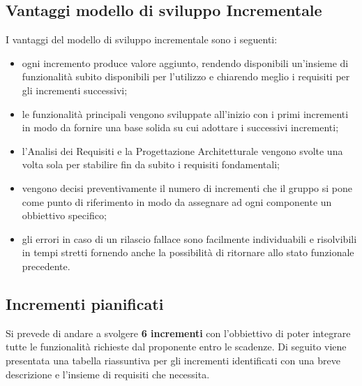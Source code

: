 \subsection{Vantaggi modello di sviluppo Incrementale}
I vantaggi del modello di sviluppo incrementale sono i seguenti:
\begin{itemize}
	\item ogni incremento produce valore aggiunto, rendendo disponibili un'insieme di funzionalità subito disponibili per l'utilizzo e chiarendo meglio i requisiti per gli incrementi successivi;
	\item le funzionalità principali vengono sviluppate all'inizio con i primi incrementi in modo da fornire una base solida su cui adottare i successivi incrementi;
	\item l'Analisi dei Requisiti e la Progettazione Architetturale vengono svolte una volta sola per stabilire fin da subito i requisiti fondamentali;
	\item vengono decisi preventivamente il numero di incrementi che il gruppo si pone come punto di riferimento in modo da assegnare ad ogni componente un obbiettivo specifico;
	\item gli errori in caso di un rilascio fallace sono facilmente individuabili e risolvibili in tempi stretti fornendo anche la possibilità di ritornare allo stato funzionale precedente.
\end{itemize}

\subsection{Incrementi pianificati}

Si prevede di andare a svolgere \textbf{6 incrementi} con l'obbiettivo di poter integrare tutte le funzionalità richieste dal proponente entro le scadenze. Di seguito viene presentata una tabella riassuntiva per gli incrementi identificati con una breve descrizione e l'insieme di requisiti che necessita.

